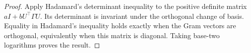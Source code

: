 \begin{proof}
Apply Hadamard's determinant inequality to the positive definite matrix
$aI+bU^\top\Gamma U$. Its determinant is invariant under the orthogonal
change of basis. Equality in Hadamard's inequality holds exactly when
the Gram vectors are orthogonal, equivalently when this matrix is
diagonal. Taking base-two logarithms proves the result.
\end{proof}
